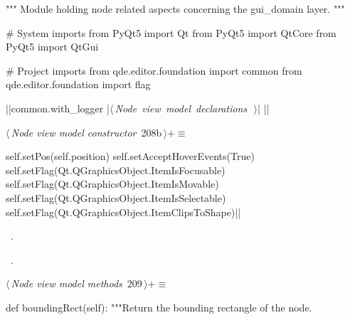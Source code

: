 \documentclass[%
    a4paper,    %
    justified,  %
    nobib,      %
    openany     %
]{tufte-book}
\makeatletter
\renewcommand{\label}[1]{\@tufte@label{##1}}%
\makeatother
\begin{document}
\begin{fullwidth}
\begin{flushleft}
\begin{minipage}{\linewidth}
\begin{pythoncode}
""" Module holding node related aspects concerning the gui_domain layer. """

# System imports
from PyQt5 import Qt
from PyQt5 import QtCore
from PyQt5 import QtGui

# Project imports
from qde.editor.foundation import common
from qde.editor.foundation import flag

|\normalfont{}\fontfamily{}|common.with_logger
|\hbox{$\langle\,${\itshape Node view model declarations}\nobreak\ {\footnotesize {}}$\,\rangle$}|
|\NWsep|
\end{pythoncode}
\vspace{1.5ex}
\footnotesize
\begin{list}{}{\setlength{\itemsep}{-\parsep}\setlength{\itemindent}{-\leftmargin}}

\item{}
\end{list}
\end{minipage}\vspace{4ex}
\end{flushleft}
\begin{flushleft} \small
\begin{minipage}{\linewidth}\label{scrap206}\raggedright\small
{} $\langle\,${\itshape Node view model constructor}\nobreak\ {\footnotesize {208b}}$\,\rangle+\equiv$
\vspace{-1ex}
\begin{pythoncode}
    self.setPos(self.position)
    self.setAcceptHoverEvents(True)
    self.setFlag(Qt.QGraphicsObject.ItemIsFocusable)
    self.setFlag(Qt.QGraphicsObject.ItemIsMovable)
    self.setFlag(Qt.QGraphicsObject.ItemIsSelectable)
    self.setFlag(Qt.QGraphicsObject.ItemClipsToShape)|\NWsep|
\end{pythoncode}
\vspace{1.5ex}
\footnotesize
\begin{list}{}{\setlength{\itemsep}{-\parsep}\setlength{\itemindent}{-\leftmargin}}
\item \NWtxtMacroDefBy\ .
\item \NWtxtMacroRefIn\ .

\item{}
\end{list}
\end{minipage}\vspace{4ex}
\end{flushleft}
\begin{flushleft} \small
\begin{minipage}{\linewidth}\label{scrap207}\raggedright\small
{} $\langle\,${\itshape Node view model methods}\nobreak\ {\footnotesize {209}}$\,\rangle+\equiv$
\vspace{-1ex}
\begin{pythoncode}
def boundingRect(self):
    """Return the bounding rectangle of the node.


\end{pythoncode}
\end{minipage}
\end{flushleft}
\end{fullwidth}
\end{document}
